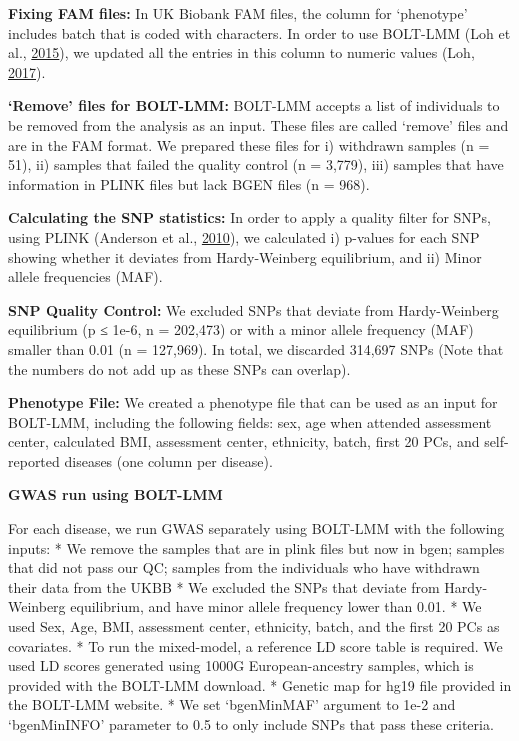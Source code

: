 \documentclass[12pt,twoside]{unicam}
\begin{document}
\textbf{Fixing FAM files:} In UK Biobank FAM files, the column for `phenotype' includes batch that is coded with characters. In order to use BOLT-LMM (Loh et al., \protect\hyperlink{ref-Loh2015}{2015}), we updated all the entries in this column to numeric values (Loh, \protect\hyperlink{ref-Loh2017}{2017}).

\textbf{`Remove' files for BOLT-LMM:} BOLT-LMM accepts a list of individuals to be removed from the analysis as an input. These files are called `remove' files and are in the FAM format. We prepared these files for i) withdrawn samples (n = 51), ii) samples that failed the quality control (n = 3,779), iii) samples that have information in PLINK files but lack BGEN files (n = 968).

\textbf{Calculating the SNP statistics:} In order to apply a quality filter for SNPs, using PLINK (Anderson et al., \protect\hyperlink{ref-Anderson2010}{2010}), we calculated i) p-values for each SNP showing whether it deviates from Hardy-Weinberg equilibrium, and ii) Minor allele frequencies (MAF).

\textbf{SNP Quality Control:} We excluded SNPs that deviate from Hardy-Weinberg equilibrium (p ≤ 1e-6, n = 202,473) or with a minor allele frequency (MAF) smaller than 0.01 (n = 127,969). In total, we discarded 314,697 SNPs (Note that the numbers do not add up as these SNPs can overlap).

\textbf{Phenotype File:} We created a phenotype file that can be used as an input for BOLT-LMM, including the following fields: sex, age when attended assessment center, calculated BMI, assessment center, ethnicity, batch, first 20 PCs, and self-reported diseases (one column per disease).

\textbf{GWAS run using BOLT-LMM}

For each disease, we run GWAS separately using BOLT-LMM with the following inputs:
* We remove the samples that are in plink files but now in bgen; samples that did not pass our QC; samples from the individuals who have withdrawn their data from the UKBB
* We excluded the SNPs that deviate from Hardy-Weinberg equilibrium, and have minor allele frequency lower than 0.01.
* We used Sex, Age, BMI, assessment center, ethnicity, batch, and the first 20 PCs as covariates.
* To run the mixed-model, a reference LD score table is required. We used LD scores generated using 1000G European-ancestry samples, which is provided with the BOLT-LMM download.
* Genetic map for hg19 file provided in the BOLT-LMM website.
* We set `bgenMinMAF' argument to 1e-2 and `bgenMinINFO' parameter to 0.5 to only include SNPs that pass these criteria.
\end{document}

